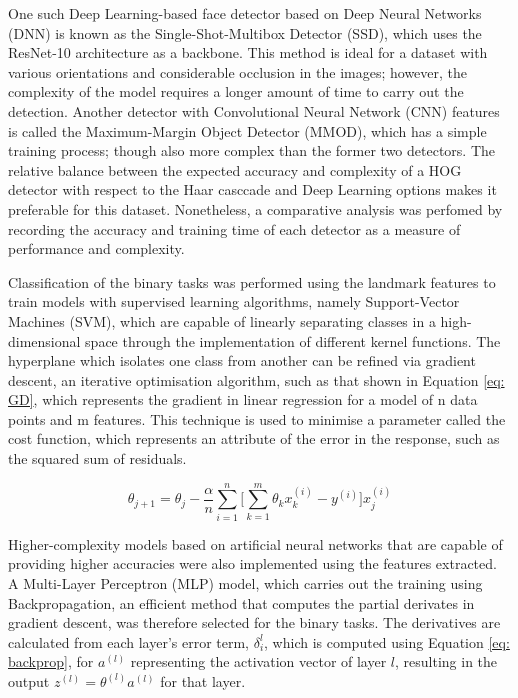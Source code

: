 \documentclass[conference]{IEEEtran}
\begin{document}
One such Deep Learning-based face detector based on Deep Neural Networks (DNN) is known as the Single-Shot-Multibox Detector (SSD), which uses the ResNet-10 architecture as a backbone. This method is ideal for a dataset with various orientations and considerable occlusion in the images; however, the complexity of the model requires a longer amount of time to carry out the detection.
Another detector with Convolutional Neural Network (CNN) features is called the Maximum-Margin Object Detector (MMOD), which has a simple training process; though also more complex than the former two detectors.
The relative balance between the expected accuracy and complexity of a HOG detector with respect to the Haar casccade and Deep Learning options makes it preferable for this dataset. Nonetheless, a comparative analysis was perfomed by recording the accuracy and training time of each detector as a measure of performance and complexity.

Classification of the binary tasks was performed using the landmark features to train models with supervised learning algorithms, namely Support-Vector Machines (SVM), which are capable of linearly separating classes in a high-dimensional space through the implementation of different kernel functions. 
The hyperplane which isolates one class from another can be refined via gradient descent, an iterative optimisation algorithm, such as that shown in Equation \ref{eq: GD}, which represents the gradient in linear regression for a model of n data points and m features. This technique is used to minimise a parameter called the cost function, which represents an attribute of the error in the response, such as the squared sum of residuals.

\begin{equation}
\theta_{j+1} = \theta_j - \frac{\alpha}{n} \sum_{i=1}^n \bigg[\sum_{k=1}^m \theta_k x_k^{(i)} - y^{(i)} \bigg] x_j^{(i)} 
\label{eq: GD}
\end{equation}

Higher-complexity models based on artificial neural networks that are capable of providing higher accuracies were also implemented using the features extracted. A Multi-Layer Perceptron (MLP) model, which carries out the training using Backpropagation, an efficient method that computes the partial derivates in gradient descent, was therefore selected for the binary tasks. The derivatives are calculated from each layer's error term, $\delta_i^l$, which is computed using Equation \ref{eq: backprop}, for $a^{(l)}$ representing the activation vector of layer $l$, resulting in the output $z^{(l)} = \theta^{(l)} a^{(l)}$ for that layer.
\end{document}
